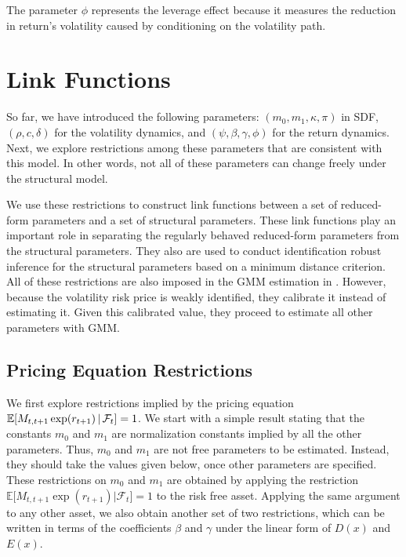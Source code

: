 The parameter $\phi$ represents the leverage effect because it measures the reduction in return's volatility caused by conditioning on the volatility path. 

\section{Link Functions}\label{sec:ilnk functions}

So far, we have introduced the following parameters: $(m_{0},m_{1},\kappa ,\pi )$ in SDF, $(\rho ,c,\delta)$ for the volatility dynamics, and $(\psi ,\beta ,\gamma ,\phi )$ for the return dynamics. Next, we explore restrictions among these parameters that are consistent with this model. In other words, not all of these parameters can change freely under the structural model.

We use these restrictions to construct link functions between a set of reduced-form parameters and a set of structural parameters. These link functions play an important role in separating the regularly behaved reduced-form parameters from the structural parameters. They also are used to conduct identification robust inference for the structural parameters based on a minimum distance criterion.
All of these restrictions are also imposed in the GMM estimation in \textcite{han2018leverage}. However, because the volatility risk price is weakly identified, they calibrate it instead of estimating it. Given this calibrated value, they proceed to estimate all other parameters with GMM. 

\subsection{Pricing Equation Restrictions}

We first explore restrictions implied by the pricing equation $\operatorname{\mathbb{E}}[ M_{t,t+1}\exp (r_{t+1}) \,\vert\, \mathcal{F}_{t}]=1$. We start with a simple result stating that the constants $m_{0}$ and $m_{1}$ are normalization constants implied by all the other parameters. Thus, $m_{0}$ and $m_{1}$ are not free parameters to be estimated. Instead, they should take the values given below, once other parameters are specified. These restrictions on $m_{0}$ and $m_{1}$ are obtained by applying the restriction $\mathbb{E[} M_{t,t+1}\exp (r_{t+1})|\mathcal{F}_{t}]=1$ to the risk free asset. Applying the same argument to any other asset, we also obtain another set of two restrictions, which can be written in terms of the coefficients $\beta $ and $ \gamma $ under the linear form of $D(x)$ and $E(x)$.

